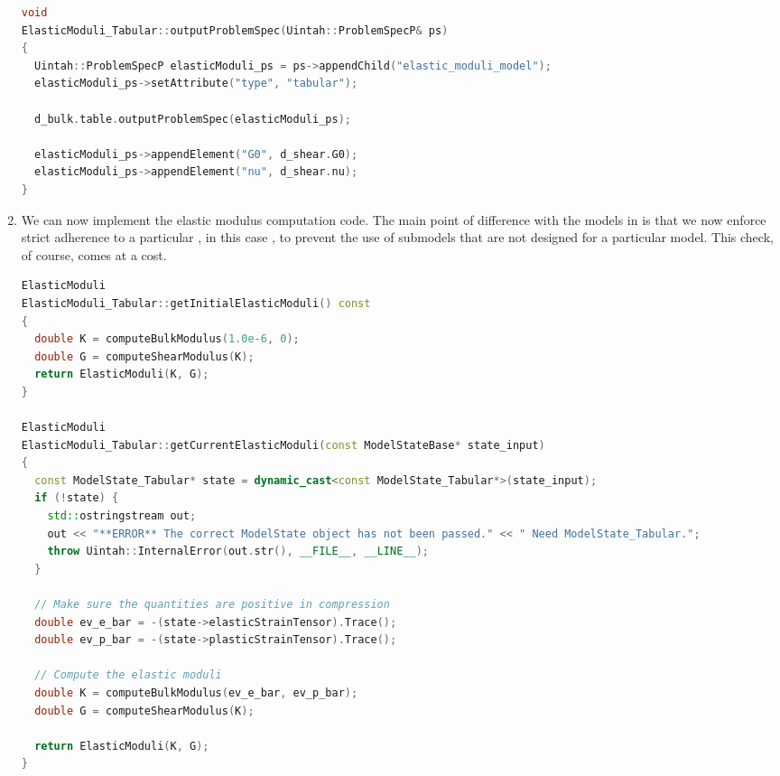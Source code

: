 \begin{enumerate}
\begin{lstlisting}[language=Cpp]
void
ElasticModuli_Tabular::outputProblemSpec(Uintah::ProblemSpecP& ps)
{
  Uintah::ProblemSpecP elasticModuli_ps = ps->appendChild("elastic_moduli_model");
  elasticModuli_ps->setAttribute("type", "tabular");

  d_bulk.table.outputProblemSpec(elasticModuli_ps);

  elasticModuli_ps->appendElement("G0", d_shear.G0);
  elasticModuli_ps->appendElement("nu", d_shear.nu);
}
\end{lstlisting}

  \item We can now implement the elastic modulus computation code.  The main point of
        difference with the models in  is that we now enforce
        strict adherence to a particular , in this case ,
        to prevent the use of submodels that are not designed for a particular model.
        This check, of course, comes at a cost.
\begin{lstlisting}[language=Cpp]
ElasticModuli
ElasticModuli_Tabular::getInitialElasticModuli() const
{
  double K = computeBulkModulus(1.0e-6, 0);
  double G = computeShearModulus(K);
  return ElasticModuli(K, G);
}

ElasticModuli
ElasticModuli_Tabular::getCurrentElasticModuli(const ModelStateBase* state_input)
{
  const ModelState_Tabular* state = dynamic_cast<const ModelState_Tabular*>(state_input);
  if (!state) {
    std::ostringstream out;
    out << "**ERROR** The correct ModelState object has not been passed." << " Need ModelState_Tabular.";
    throw Uintah::InternalError(out.str(), __FILE__, __LINE__);
  }

  // Make sure the quantities are positive in compression
  double ev_e_bar = -(state->elasticStrainTensor).Trace();
  double ev_p_bar = -(state->plasticStrainTensor).Trace();

  // Compute the elastic moduli
  double K = computeBulkModulus(ev_e_bar, ev_p_bar);
  double G = computeShearModulus(K);

  return ElasticModuli(K, G);
}
\end{lstlisting}


\end{enumerate}
